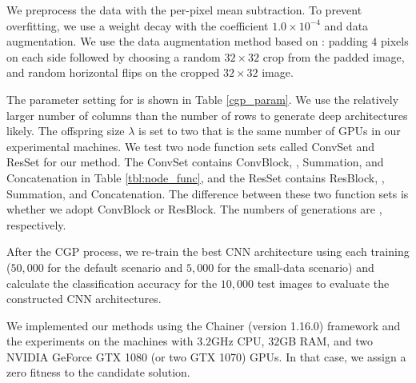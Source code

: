 We preprocess the data with the per-pixel mean subtraction.
To prevent overfitting, we use a weight decay with the coefficient $1.0 \times 10^{-4}$ and data augmentation.
We use the data augmentation method based on \cite{he_deep_2016}: padding $4$ pixels on each side followed by choosing a random $32\times 32$ crop from the padded image, and random horizontal flips on the cropped $32 \times 32$ image.

The parameter setting for  is shown in Table \ref{cgp_param}. We use the relatively larger number of columns than the number of rows to generate deep architectures  likely.
The offspring size  $\lambda$ is set to two\new{;} that is the same number of GPUs in our experimental machines.
We test two node function sets called ConvSet and ResSet for our method.
The ConvSet contains ConvBlock,  , Summation, and Concatenation in Table \ref{tbl:node_func}, and the ResSet contains ResBlock,  , Summation, and Concatenation.
The difference between these two function sets is whether we adopt ConvBlock or ResBlock.
The numbers of generations are , respectively.

After the CGP process, we re-train the best CNN architecture using each training  ($50,000$ for the default scenario and $5,000$ for the small-data scenario)\new{,} and  calculate the classification accuracy for the $10,000$ test images to evaluate the constructed CNN architectures.

 

We  implemented our methods using the Chainer \cite{tokui_chainer:_2015} (version 1.16.0) framework and  the experiments on the machines with $3.2$GHz CPU, $32$GB RAM, and two NVIDIA GeForce GTX 1080 (or two GTX 1070) GPUs.
 
In that case, we assign a zero fitness to the candidate solution.

